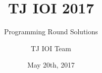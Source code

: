 \documentclass[a4paper,11pt]{scrartcl}
\begin{document}
\title{TJ IOI 2017}
\subtitle{Programming Round Solutions}
\date{May 20th, 2017}

\author{TJ IOI Team}
\end{document}
